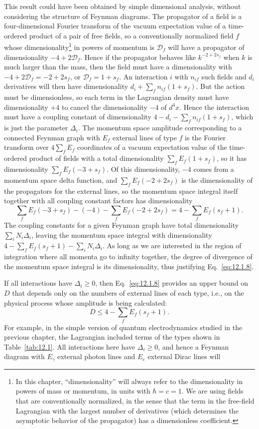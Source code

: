 This result could have been obtained by simple dimensional analysis, without
considering the structure of Feynman diagrams. The propagator of a field is a
four-dimensional Fourier transform of the vacuum expectation value of a
time-ordered product of a pair of free fields, so a conventionally normalized
field $f$ whose dimensionality\footnote{In this chapter, ``dimensionality''
will always refer to the dimensionality in powers of mass or momentum, in
units with $\hbar=c=1$. We are using fields that are conventionally
normalized, in the sense that the term in the free-field Lagrangian with the
largest number of derivatives (which determines the asymptotic behavior of the
propagator) has a dimensionless coefficient.} in powers of momentum is
$\mathcal D_f$ will have a propagator of dimensionality $-4+2\mathcal D_f$.
Hence if the propagator behaves like $k^{-2+2s_f}$ when $k$ is much larger
than the mass, then the field must have a dimensionality with
$-4+2\mathcal D_f=-2+2s_f$, or $\mathcal D_f=1+s_f$. An interaction $i$ with
$n_{if}$ such fields and $d_i$ derivatives will then have dimensionality
$d_i+\sum_f n_{if}(1+s_f)$. But the action must be dimensionless, so each
term in the Lagrangian density must have dimensionality $+4$ to cancel the
dimensionality $-4$ of $d^4x$. Hence the interaction must have a coupling
constant of dimensionality $4-d_i-\sum_f n_{if}(1+s_f)$, which is just the
parameter $\Delta_i$. The momentum space amplitude corresponding to a
connected Feynman graph with $E_f$ external lines of type $f$ is the Fourier
transform over $4\sum_f E_f$ coordinates of a vacuum expectation value of the
time-ordered product of fields with a total dimensionality
$\sum_f E_f(1+s_f)$, so it has dimensionality $\sum_f E_f(-3+s_f)$. Of this
dimensionality, $-4$ comes from a momentum space delta function, and
$\sum_f E_f(-2+2s_f)$ is the dimensionality of the propagators for the
external lines, so the momentum space integral itself together with all
coupling constant factors has dimensionality
\[
  \sum_f E_f(-3+s_f)-(-4)-\sum_f E_f(-2+2s_f)
  =4-\sum_f E_f(s_f+1).
\]
The coupling constants for a given Feynman graph have total dimensionality
$\sum_i N_i\Delta_i$, leaving the momentum space integral with dimensionality
$4-\sum_f E_f(s_f+1)-\sum_iN_i\Delta_i$. As long as we are interested in the
region of integration where all momenta go to infinity together, the degree of
divergence of the momentum space integral is its dimensionality, thus
justifying Eq.~\eqref{eq:12.1.8}.

If all interactions have $\Delta_i\geq0$, then Eq.~\eqref{eq:12.1.8} provides
an upper bound on $D$ that depends only on the numbers of external lines of
each type, i.e., on the physical process whose amplitude is being calculated:
\begin{equation}
  D\leq4-\sum_f E_f(s_f+1).
  \tag{12.1.10}\label{eq:12.1.10}
\end{equation}
For example, in the simple version of quantum electrodynamics studied in the
previous chapter, the Lagrangian included terms of the types shown in
Table~\ref{tab:12.1}. All interactions here have $\Delta_i\geq0$, and hence a
Feynman diagram with $E_\gamma$ external photon lines and $E_e$ external Dirac
lines will

